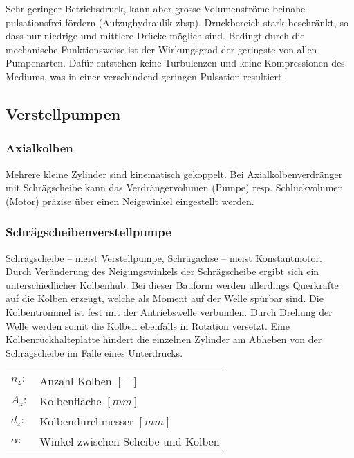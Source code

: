 Sehr geringer Betriebsdruck, kann aber grosse Volumenströme beinahe pulsationsfrei fördern (Aufzughydraulik zbsp). 
Druckbereich stark beschränkt, so dass nur niedrige und mittlere Drücke möglich sind. Bedingt durch die mechanische Funktionsweise ist der Wirkungsgrad der geringste von allen Pumpenarten. Dafür entstehen keine Turbulenzen und keine Kompressionen des Mediums, was in einer verschindend geringen Pulsation resultiert. 



\subsection{Verstellpumpen}

\subsubsection{Axialkolben}
Mehrere kleine Zylinder sind kinematisch gekoppelt. Bei Axialkolbenverdränger mit Schrägscheibe kann das Verdrängervolumen (Pumpe) resp. Schluckvolumen (Motor) präzise über einen Neigewinkel eingestellt werden.

\subsubsection{Schrägscheibenverstellpumpe}
Schrägscheibe – meist Verstellpumpe, Schrägachse – meist Konstantmotor.\\
Durch Veränderung des Neigungswinkels der Schrägscheibe ergibt sich ein unterschiedlicher Kolbenhub. Bei dieser Bauform werden allerdings Querkräfte auf die Kolben erzeugt, welche als Moment auf der Welle spürbar sind. Die Kolbentrommel ist fest mit der Antriebswelle verbunden. Durch Drehung der Welle werden somit die Kolben ebenfalls in Rotation versetzt. Eine Kolbenrückhalteplatte hindert die einzelnen Zylinder am Abheben von der Schrägscheibe im Falle eines Unterdrucks. 

\begin{tabular}{ll}
$n_z:$ & Anzahl Kolben $[-]$ \\
$A_z:$ & Kolbenfläche $[mm]$ \\
$d_z:$ & Kolbendurchmesser $[mm]$ \\
$\alpha: $ & Winkel zwischen Scheibe und Kolben
\end{tabular}


